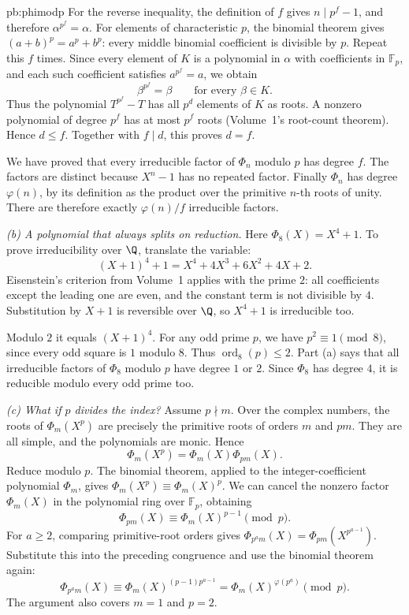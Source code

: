 \begin{solution}{pb:phimodp}
For the reverse inequality, the definition of $f$
gives $n\mid p^f-1$, and therefore
$\alpha^{p^f}=\alpha$.
For elements of characteristic $p$, the binomial
theorem gives $(a+b)^p=a^p+b^p$: every middle
binomial coefficient is divisible by $p$.
Repeat this $f$ times. Since every element of
$K$ is a polynomial in $\alpha$ with coefficients
in $\mathbb F_p$, and each such coefficient
satisfies $a^{p^f}=a$, we obtain
\[
\beta^{p^f}=\beta\qquad\text{for every }\beta\in K.
\]
Thus the polynomial $T^{p^f}-T$ has all $p^d$
elements of $K$ as roots. A nonzero polynomial
of degree $p^f$ has at most $p^f$ roots
(Volume~1's root-count theorem). Hence $d\le f$.
Together with $f\mid d$, this proves $d=f$.

We have proved that every irreducible factor
of $\Phi_n$ modulo $p$ has degree $f$.
The factors are distinct because $X^n-1$
has no repeated factor. Finally $\Phi_n$ has
degree $\varphi(n)$, by its definition as the
product over the primitive $n$-th roots of unity.
There are therefore exactly $\varphi(n)/f$
irreducible factors.

\emph{(b) A polynomial that always splits on reduction.}
Here $\Phi_8(X)=X^4+1$. To prove irreducibility over $\Q$,
translate the variable:
\[
(X+1)^4+1=X^4+4X^3+6X^2+4X+2.
\]
Eisenstein's criterion from Volume~1 applies with the prime $2$:
all coefficients except the leading one are even, and the constant
term is not divisible by $4$. Substitution by $X+1$ is reversible
over $\Q$, so $X^4+1$ is irreducible too.

Modulo $2$ it equals $(X+1)^4$.
For any odd prime $p$, we have
$p^2\equiv1\pmod8$, since every odd square
is $1$ modulo $8$.
Thus $\operatorname{ord}_8(p)\le2$.
Part (a) says that all irreducible factors
of $\Phi_8$ modulo $p$ have degree $1$ or $2$.
Since $\Phi_8$ has degree $4$, it is
reducible modulo every odd prime too.

\emph{(c) What if $p$ divides the index?}
Assume $p\nmid m$. Over the complex numbers,
the roots of $\Phi_m(X^p)$ are precisely the
primitive roots of orders $m$ and $pm$.
They are all simple, and the polynomials
are monic. Hence
\[
\Phi_m(X^p)=\Phi_m(X)\Phi_{pm}(X).
\]
Reduce modulo $p$. The binomial theorem,
applied to the integer-coefficient
polynomial $\Phi_m$, gives
$\Phi_m(X^p)\equiv\Phi_m(X)^p$.
We can cancel the nonzero factor $\Phi_m(X)$
in the polynomial ring over $\mathbb F_p$,
obtaining
\[
\Phi_{pm}(X)\equiv\Phi_m(X)^{p-1}\pmod p.
\]
For $a\ge2$, comparing primitive-root
orders gives
$\Phi_{p^am}(X)=\Phi_{pm}(X^{p^{a-1}})$.
Substitute this into the preceding congruence
and use the binomial theorem again:
\[
\Phi_{p^am}(X)
 \equiv \Phi_m(X)^{(p-1)p^{a-1}}
 =\Phi_m(X)^{\varphi(p^a)}\pmod p.
\]
The argument also covers $m=1$ and $p=2$.


\end{solution}
